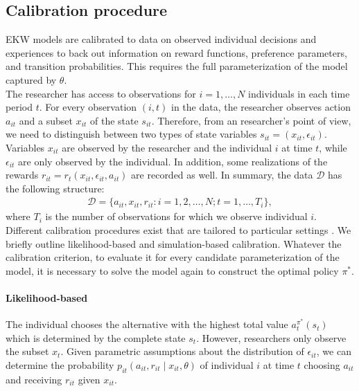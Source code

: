 \subsection{Calibration procedure}
EKW models are calibrated to data on observed individual decisions and experiences to back out information on reward functions, preference parameters, and transition probabilities.  This requires the full parameterization of the model captured by $\theta$.\\

\noindent The researcher has access to observations for $i = 1, \hdots, N$ individuals in each time period $t$. For every observation $(i, t)$ in the data, the researcher observes action $a_{it}$ and a subset $x_{it}$ of the state $s_{it}$. Therefore, from an researcher's point of view, we need to distinguish between two types of state variables $s_{it} = (x_{it}, \epsilon_{it})$. Variables $x_{it}$ are observed by the researcher and the individual $i$ at time $t$, while $\epsilon_{it}$ are only observed by the individual. In addition, some realizations of the rewards $r_{it} = r_t(x_{it}, \epsilon_{it}, a_{it})$ are recorded as well. In summary, the data $\mathcal{D}$ has the following structure:
%
\begin{align*}
  \mathcal{D} = \{a_{it}, x_{it}, r_{it}: i = 1,2, \hdots, N; t = 1, \hdots, T_i\},
\end{align*}
where $T_i$ is the number of observations for which we observe individual $i$.\\

\noindent Different calibration procedures exist that are tailored to particular settings \citep{Davidson.2003, Gourieroux.1996}. We briefly outline likelihood-based and simulation-based calibration. Whatever the calibration criterion, to evaluate it for every candidate parameterization of the model, it is necessary to solve the model again to construct the optimal policy $\pi^*$.

\paragraph{Likelihood-based} The individual chooses the alternative with the highest total value $a_t^{\pi^*}(s_t)$ which is determined by the complete state $s_t$. However, researchers only observe the subset $x_t$. Given parametric assumptions about the distribution of $\epsilon_{it}$, we can determine the probability $p_{it}(a_{it}, r_{it} \mid x_{it}, \theta)$ of individual $i$ at time $t$ choosing $a_{it}$ and receiving $r_{it}$ given $x_{it}$.\\

